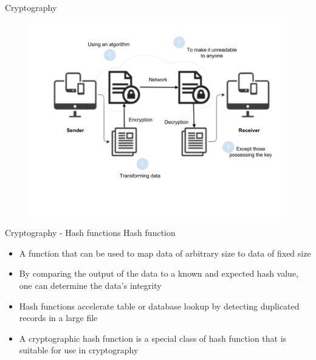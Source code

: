\documentclass[10pt]{beamer}
\begin{document}


\begin{frame}{Cryptography}
	\begin{figure}[]
		\centering
		\includegraphics  [scale=0.3]{Images/cryptography}
		\begin{centering}
		\end{centering}
	\end{figure}
\end{frame}

\begin{frame}{Cryptography - Hash functions}
	Hash function
	\begin{itemize}
		\item A function that can be used to map data of arbitrary size to data of fixed size
		\item By comparing the output of the data to a known and expected hash value, one can determine the data's integrity
		\item Hash functions accelerate table or database lookup by detecting duplicated records in a large file
		\item A cryptographic hash function is a special class of hash function that is suitable for use in cryptography
	\end{itemize}
\end{frame}

\end{document}
